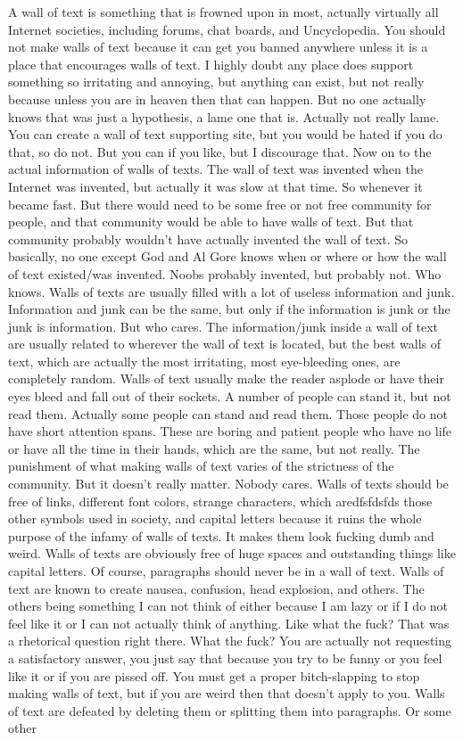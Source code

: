 \documentclass[11pt]{article}
\begin{document}
\begin{center}
\cite{lamport94}
A wall of text is something that is frowned upon in most, actually virtually all Internet societies, including forums, chat boards, and Uncyclopedia. You should not make walls of text because it can get you banned anywhere unless it is a place that encourages walls of text. I highly doubt any place does support something so irritating and annoying, but anything can exist, but not really because unless you are in heaven then that can happen. But no one actually knows that was just a hypothesis, a lame one that is. Actually not really lame. You can create a wall of text supporting site, but you would be hated if you do that, so do not. But you can if you like, but I discourage that. Now on to the actual information of walls of texts. The wall of text was invented when the Internet was invented, but actually it was slow at that time. So whenever it became fast. But there would need to be some free or not free community for people, and that community would be able to have walls of text. But that community probably wouldn't have actually invented the wall of text. So basically, no one except God and Al Gore knows when or where or how the wall of text existed/was invented. Noobs probably invented, but probably not. Who knows. Walls of texts are usually filled with a lot of useless information and junk. Information and junk can be the same, but only if the information is junk or the junk is information. But who cares. The information/junk inside a wall of text are usually related to wherever the wall of text is located, but the best walls of text, which are actually the most irritating, most eye-bleeding ones, are completely random. Walls of text usually make the reader asplode or have their eyes bleed and fall out of their sockets. A number of people can stand it, but not read them. Actually some people can stand and read them. Those people do not have short attention spans. These are boring and patient people who have no life or have all the time in their hands, which are the same, but not really. The punishment of what making walls of text varies of the strictness of the community. But it doesn't really matter. Nobody cares. Walls of texts should be free of links, different font colors, strange characters, which aredfsfdsfds those other symbols used in society, and capital letters because it ruins the whole purpose of the infamy of walls of texts. It makes them look fucking dumb and weird. Walls of texts are obviously free of huge spaces and outstanding things like capital letters. Of course, paragraphs should never be in a wall of text. Walls of text are known to create nausea, confusion, head explosion, and others. The others being something I can not think of either because I am lazy or if I do not feel like it or I can not actually think of anything. Like what the fuck? That was a rhetorical question right there. What the fuck? You are actually not requesting a satisfactory answer, you just say that because you try to be funny or you feel like it or if you are pissed off. You must get a proper bitch-slapping to stop making walls of text, but if you are weird then that doesn't apply to you. Walls of text are defeated by deleting them or splitting them into paragraphs. Or some other 
\end{center}
\end{document}
